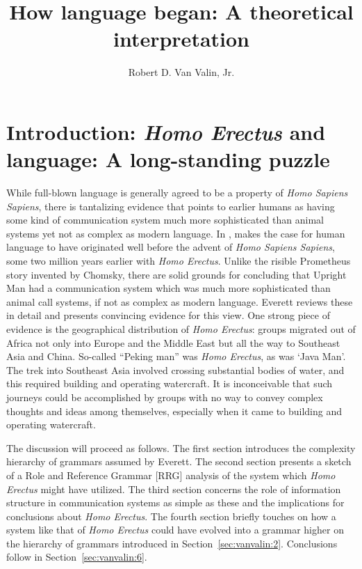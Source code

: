 \documentclass[output=paper,colorlinks,citecolor=brown]{langscibook}
\author{Robert D. Van Valin, Jr.\orcid{}\affiliation{The State University of New York at Buffalo \& Heinrich Heine University Düsseldorf}}
\title{How language began: A theoretical interpretation}
\begin{document}
\maketitle

\section{Introduction: \emph{Homo Erectus} and language: A long-standing puzzle}
While full-blown language is generally agreed to be a property of \emph{Homo Sapiens Sapiens}, there is tantalizing evidence that points to earlier humans as having some kind of communication system much more sophisticated than animal systems yet not as complex as modern language. In , \citet{everett2017language} makes the case for human language to have originated well before the advent of \emph{Homo Sapiens Sapiens}, some two million years earlier with \emph{Homo Erectus}. Unlike the risible Prometheus story invented by Chomsky, there are solid grounds for concluding that Upright Man had a communication system which was much more sophisticated than animal call systems, if not as complex as modern language.  Everett reviews these in detail and presents convincing evidence for this view.  One strong piece of evidence is the geographical distribution of \emph{Homo Erectus}: groups migrated out of Africa not only into Europe and the Middle East but all the way to Southeast Asia and China.  So-called “Peking man” was \emph{Homo Erectus}, as was ‘Java Man’.  The trek into Southeast Asia involved crossing substantial bodies of water, and this required building and operating watercraft.  It is inconceivable that such journeys could be accomplished by groups with no way to convey complex thoughts and ideas among themselves, especially when it came to building and operating watercraft.  

The discussion will proceed as follows. The first section introduces the complexity hierarchy of grammars assumed by Everett.  The second section presents a sketch of a Role and Reference Grammar [RRG] \citep{van2005exploring,van1997syntax} analysis of the system which \emph{Homo Erectus} might have utilized.  The third section concerns the role of information structure in communication systems as simple as these and the implications for conclusions about \emph{Homo Erectus}.  The fourth section briefly touches on how a system like that of \emph{Homo Erectus} could have evolved into a grammar higher on the hierarchy of grammars introduced in Section~\ref{sec:vanvalin:2}. Conclusions follow in Section~\ref{sec:vanvalin:6}.
\end{document}
